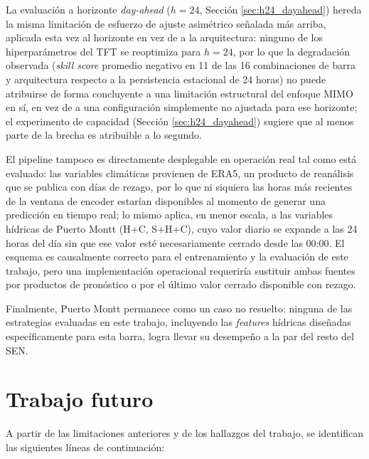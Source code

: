 La evaluación a horizonte \textit{day-ahead} ($h=24$, Sección \ref{sec:h24_dayahead}) hereda la misma limitación de esfuerzo de ajuste asimétrico señalada más arriba, aplicada esta vez al horizonte en vez de a la arquitectura: ninguno de los hiperparámetros del TFT se reoptimiza para $h=24$, por lo que la degradación observada (\textit{skill score} promedio negativo en 11 de las 16 combinaciones de barra y arquitectura respecto a la persistencia estacional de 24 horas) no puede atribuirse de forma concluyente a una limitación estructural del enfoque MIMO en sí, en vez de a una configuración simplemente no ajustada para ese horizonte; el experimento de capacidad (Sección \ref{sec:h24_dayahead}) sugiere que al menos parte de la brecha es atribuible a lo segundo.

El pipeline tampoco es directamente desplegable en operación real tal como está evaluado: las variables climáticas provienen de ERA5, un producto de reanálisis que se publica con días de rezago, por lo que ni siquiera las horas más recientes de la ventana de encoder estarían disponibles al momento de generar una predicción en tiempo real; lo mismo aplica, en menor escala, a las variables hídricas de Puerto Montt (H+C, S+H+C), cuyo valor diario se expande a las 24 horas del día sin que ese valor esté necesariamente cerrado desde las 00:00. El esquema es causalmente correcto para el entrenamiento y la evaluación de este trabajo, pero una implementación operacional requeriría sustituir ambas fuentes por productos de pronóstico o por el último valor cerrado disponible con rezago.

Finalmente, Puerto Montt permanece como un caso no resuelto: ninguna de las estrategias evaluadas en este trabajo, incluyendo las \textit{features} hídricas diseñadas específicamente para esta barra, logra llevar su desempeño a la par del resto del SEN.

\section{Trabajo futuro}

A partir de las limitaciones anteriores y de los hallazgos del trabajo, se identifican las siguientes líneas de continuación:

